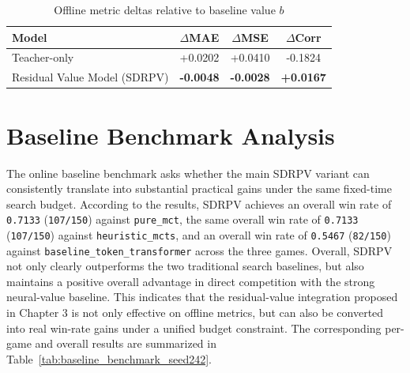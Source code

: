 \begin{table}[htbp]
\centering
\caption{Offline metric deltas relative to baseline value $b$}
\label{tab:offline_delta_vs_b}
\begin{tabular}{lccc}
\toprule
Model & $\Delta$MAE & $\Delta$MSE & $\Delta$Corr \\
\midrule
Teacher-only & +0.0202 & +0.0410 & -0.1824 \\
Residual Value Model (SDRPV) & \textbf{-0.0048} & \textbf{-0.0028} & \textbf{+0.0167} \\
\bottomrule
\end{tabular}
\end{table}


\section{Baseline Benchmark Analysis}

The online baseline benchmark asks whether the main SDRPV variant can consistently translate into substantial practical gains under the same fixed-time search budget. According to the results, SDRPV achieves an overall win rate of \texttt{0.7133} (\texttt{107/150}) against \texttt{pure_mct}, the same overall win rate of \texttt{0.7133} (\texttt{107/150}) against \texttt{heuristic_mcts}, and an overall win rate of \texttt{0.5467} (\texttt{82/150}) against \texttt{baseline_token_transformer} across the three games. Overall, SDRPV not only clearly outperforms the two traditional search baselines, but also maintains a positive overall advantage in direct competition with the strong neural-value baseline. This indicates that the residual-value integration proposed in Chapter 3 is not only effective on offline metrics, but can also be converted into real win-rate gains under a unified budget constraint.
The corresponding per-game and overall results are summarized in Table~\ref{tab:baseline_benchmark_seed242}.



